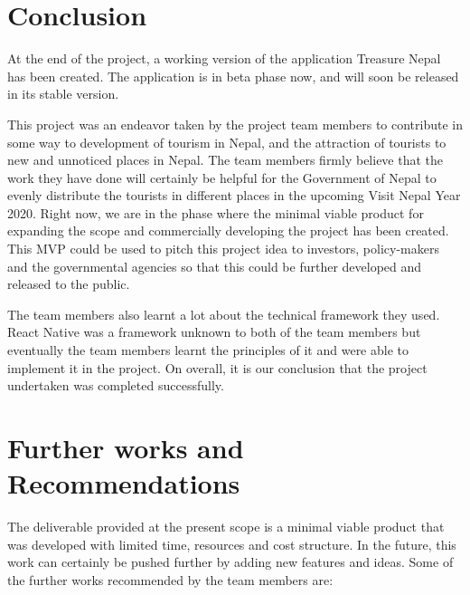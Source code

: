 \documentclass[12pt, a4paper, oneside]{article}
\begin{document}
\pagebreak
\section{Conclusion}
At the end of the project, a working version of the application Treasure Nepal has been created. The application is in beta phase now, and will soon be released in its stable version.

This project was an endeavor taken by the project team members to contribute in some way to development of tourism in Nepal, and the attraction of tourists to new and unnoticed places in Nepal. The team members firmly believe that the work they have done will certainly be helpful for the Government of Nepal to evenly distribute the tourists in different places in the upcoming Visit Nepal Year 2020. Right now, we are in the phase where the minimal viable product for expanding the scope and commercially developing the project has been created. This MVP could be used to pitch this project idea to investors, policy-makers and the governmental agencies so that this could be further developed and released to the public.

The team members also learnt a lot about the technical framework they used. React Native was a framework unknown to both of the team members but eventually the team members learnt the principles of it and were able to implement it in the project. On overall, it is our conclusion that the project undertaken was completed successfully.

\pagebreak
\section{Further works and Recommendations}
The deliverable provided at the present scope is a minimal viable product that was developed with limited time, resources and cost structure. In the future, this work can certainly be pushed further by adding new features and ideas. Some of the further works recommended by the team members are:
\end{document}
